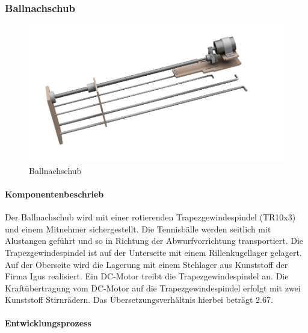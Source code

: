 \subsubsection{Ballnachschub}
\begin{figure}[h!]
	\centering
	\includegraphics[width=\linewidth]{../../fig/Ballnachschub}
	\caption{Ballnachschub}
	\label{fig:Ballnachschub}
\end{figure}
\paragraph{Komponentenbeschrieb}

Der Ballnachschub wird mit einer rotierenden Trapezgewindespindel (TR10x3) und einem Mitnehmer sichergestellt. Die Tennisbälle werden seitlich mit Alustangen geführt und so in Richtung der Abwurfvorrichtung transportiert. Die Trapezgewindespindel ist auf der Unterseite mit einem Rillenkugellager gelagert. Auf der Oberseite wird die Lagerung mit einem Stehlager aus Kunststoff der Firma Igus realisiert. Ein DC-Motor treibt die Trapezgewindespindel an. Die Kraftübertragung vom DC-Motor auf die Trapezgewindespindel erfolgt mit zwei Kunststoff Stirnrädern. Das Übersetzungsverhältnis hierbei beträgt 2.67.

\paragraph{Entwicklungsprozess}

